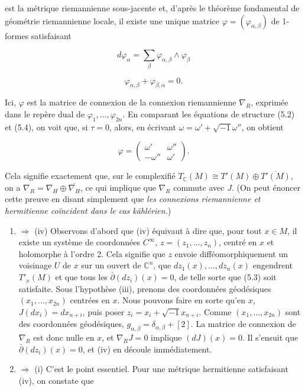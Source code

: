 \documentclass[
  french,
  a3paper,
  a3paper]{extarticle}
\begin{document}
est la métrique riemannienne sous-jacente et, d'après le théorème
fondamental de géométrie riemannienne locale, il existe une unique
matrice \(\varphi=(\varphi_{\alpha,\beta})\) de 1-formes satisfaisant

\[d\varphi_\alpha=\sum_\beta\varphi_{\alpha,\beta}\wedge\varphi_\beta\]

\[\tag{5.4}\varphi_{\alpha,\beta}+\varphi_{\beta,\alpha}=0.\]

Ici, \(\varphi\) est la matrice de connexion de la connexion
riemannienne \(\nabla_R\), exprimée dans le repère dual de
\(\varphi_1,\ldots,\varphi_{2n}\). En comparant les équations de
structure (5.2) et (5.4), on voit que, si \(\tau=0\), alors, en écrivant
\(\omega=\omega'+\sqrt{-1}\omega''\), on obtient

\[\varphi=\begin{pmatrix}\omega'&\omega''\\-\omega''&\omega'\end{pmatrix}.\]

Cela signifie exactement que, sur le complexifié
\(T_{\mathbb C}(M)\cong T'(M)\oplus\overline{T'(M)}\), on a
\(\nabla_R=\nabla_H\oplus\overline{\nabla_H}\), ce qui implique que
\(\nabla_R\) commute avec \(J\). (On peut énoncer cette preuve en disant
simplement que \emph{les connexions riemannienne et hermitienne
coïncident dans le cas kählérien.})

\begin{enumerate}
\def\labelenumi{(\roman{enumi})}
\setcounter{enumi}{2}
\item
  \(\Rightarrow\) (iv) Observons d'abord que (iv) équivaut à dire que,
  pour tout \(x\in M\), il existe un système de coordonnées
  \(C^\infty\), \(z=(z_1,\ldots,z_n)\), centré en \(x\) et holomorphe à
  l'ordre 2. Cela signifie que \(z\) envoie difféomorphiquement un
  voisinage \(U\) de \(x\) sur un ouvert de \(\mathbb C^n\), que
  \(dz_1(x),\ldots,dz_n(x)\) engendrent \(T'_x(M)\) et que tous les
  \(\bar\partial(dz_i)(x)=0\), de telle sorte que (5.3) soit satisfaite.
  Sous l'hypothèse (iii), prenons des coordonnées géodésiques
  \((x_1,\ldots,x_{2n})\) centrées en \(x\). Nous pouvons faire en sorte
  qu'en \(x\), \(J(dx_i)=dx_{n+i}\), puis poser
  \(z_i=x_i+\sqrt{-1}x_{n+i}\). Comme \((x_1,\ldots,x_{2n})\) sont des
  coordonnées géodésiques,
  \(g_{\alpha,\beta}=\delta_{\alpha,\beta}+[2]\). La matrice de
  connexion de \(\nabla_R\) est donc nulle en \(x\), et \(\nabla_RJ=0\)
  implique \((dJ)(x)=0\). Il s'ensuit que \(\bar\partial(dz_i)(x)=0\),
  et (iv) en découle immédiatement.
\item
  \(\Rightarrow\) (i) C'est le point essentiel. Pour une métrique
  hermitienne satisfaisant (iv), on constate que
\end{enumerate}
\end{document}
